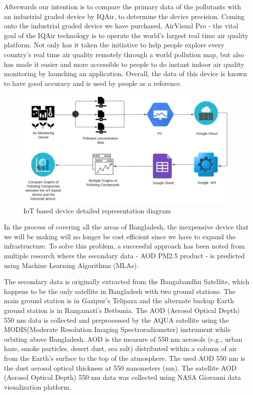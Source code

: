 Afterwards our intention is to compare the primary data of the pollutants with an industrial graded device by IQAir, to determine the device precision. Coming onto the industrial graded device we have purchased, AirVisual Pro -  the vital goal of the IQAir technology is to operate the world’s largest real time air quality platform. Not only has it taken the initiative to help people explore every country’s real time air quality remotely through a world pollution map, but also has made it easier and more accessible to people to do instant indoor air quality monitoring by launching an application. Overall, the data of this device is known to have good accuracy and is used by people as a reference. 

\begin{figure} [H]
    \centering
    \includegraphics[width=\textwidth]{images/1_2_System Design RefinAir.jpeg}
    \caption{IoT based device detailed representation diagram}
    \label{fig:System Design RefinAir}
\end{figure}

In the process of covering all the areas of Bangladesh, the inexpensive device that we will be making will no longer be cost efficient since we have to expand the infrastructure. To solve this problem, a successful approach has been noted from multiple research where the secondary data - AOD PM2.5 product - is predicted using Machine Learning Algorithms (MLAs).

The secondary data is originally extracted from the Bangabandhu Satellite, which happens to be the only satellite in Bangladesh with two ground stations. The main ground station is in Gazipur’s Telipara and the alternate backup Earth ground station is in Rangamati’s Betbunia. The AOD (Aerosol Optical Depth) 550 nm data is collected and preprocessed by the AQUA satellite using the MODIS(Moderate Resolution Imaging  Spectroradiometer) instrument while orbiting above Bangladesh. AOD is the measure of  550 nm aerosols (e.g., urban haze, smoke particles, desert dust,  sea salt) distributed within a column of air from the Earth’s surface to the top of the atmosphere. The  used AOD 550 nm is the dust aerosol optical thickness at 550 nanometers (nm). The satellite AOD  (Aerosol Optical Depth) 550 nm data was collected using NASA Giovanni data visualization platform. 

